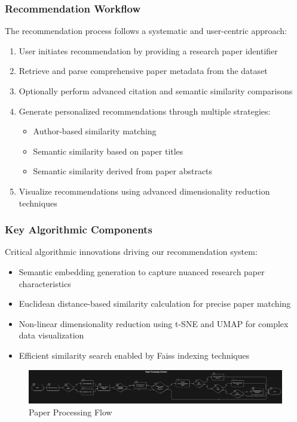 \documentclass[runningheads]{llncs}
\begin{document}
\subsubsection*{Recommendation Workflow}
The recommendation process follows a systematic and user-centric approach:
\begin{enumerate}
\item User initiates recommendation by providing a research paper identifier
\item Retrieve and parse comprehensive paper metadata from the dataset
\item Optionally perform advanced citation and semantic similarity comparisons
\item Generate personalized recommendations through multiple strategies:
\begin{itemize}
\item Author-based similarity matching
\item Semantic similarity based on paper titles
\item Semantic similarity derived from paper abstracts
\end{itemize}
\item Visualize recommendations using advanced dimensionality reduction techniques
\end{enumerate}
\subsubsection*{Key Algorithmic Components}
Critical algorithmic innovations driving our recommendation system:
\begin{itemize}
\item Semantic embedding generation to capture nuanced research paper characteristics
\item Euclidean distance-based similarity calculation for precise paper matching
\item Non-linear dimensionality reduction using t-SNE and UMAP for complex data visualization
\item Efficient similarity search enabled by Faiss indexing techniques
\end{itemize}


\begin{figure}
    \centering
    \includegraphics[width=1\linewidth]{paper processing flow.png}
    \caption{Paper Processing Flow}
    \label{fig1}
\end{figure}
\end{document}
